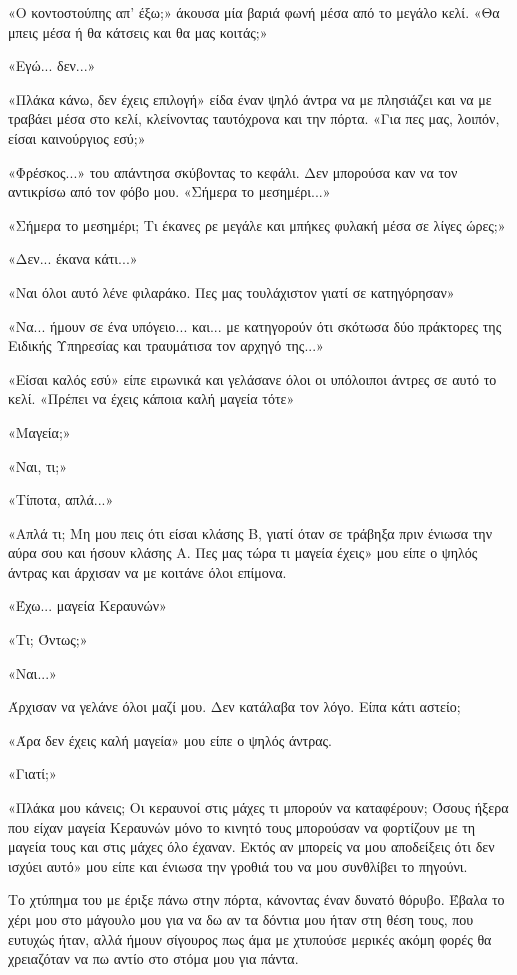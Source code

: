 \documentclass[12pt,twoside, openany]{book}
\begin{document}
«Ο κοντοστούπης απ’ έξω;» άκουσα μία βαριά φωνή μέσα από το μεγάλο κελί. «Θα μπεις μέσα ή θα κάτσεις και θα μας κοιτάς;»

«Εγώ... δεν...»

«Πλάκα κάνω, δεν έχεις επιλογή» είδα έναν ψηλό άντρα να με πλησιάζει και να με τραβάει μέσα στο κελί, κλείνοντας ταυτόχρονα και την πόρτα. «Για πες μας, λοιπόν, είσαι καινούργιος εσύ;»

«Φρέσκος...» του απάντησα σκύβοντας το κεφάλι. Δεν μπορούσα καν να τον αντικρίσω από τον φόβο μου. «Σήμερα το μεσημέρι...»

«Σήμερα το μεσημέρι; Τι έκανες ρε μεγάλε και μπήκες φυλακή μέσα σε λίγες ώρες;»

«Δεν... έκανα κάτι...»

«Ναι όλοι αυτό λένε φιλαράκο. Πες μας τουλάχιστον γιατί σε κατηγόρησαν»

«Να... ήμουν σε ένα υπόγειο... και... με κατηγορούν ότι σκότωσα δύο πράκτορες της Ειδικής Υπηρεσίας και τραυμάτισα τον αρχηγό της...»

«Είσαι καλός εσύ» είπε ειρωνικά και γελάσανε όλοι οι υπόλοιποι άντρες σε αυτό το κελί. «Πρέπει να έχεις κάποια καλή μαγεία τότε»

«Μαγεία;»

«Ναι, τι;»

«Τίποτα, απλά...»

«Απλά τι; Μη μου πεις ότι είσαι κλάσης Β, γιατί όταν σε τράβηξα πριν ένιωσα την αύρα σου και ήσουν κλάσης Α. Πες μας τώρα τι μαγεία έχεις» μου είπε ο ψηλός άντρας και άρχισαν να με κοιτάνε όλοι επίμονα.

«Έχω... μαγεία Κεραυνών»

«Τι; Όντως;»

«Ναι...»

Άρχισαν να γελάνε όλοι μαζί μου. Δεν κατάλαβα τον λόγο. Είπα κάτι αστείο;

«Άρα δεν έχεις καλή μαγεία» μου είπε ο ψηλός άντρας.

«Γιατί;»

«Πλάκα μου κάνεις; Οι κεραυνοί στις μάχες τι μπορούν να καταφέρουν; Όσους ήξερα που είχαν μαγεία Κεραυνών μόνο το κινητό τους μπορούσαν να φορτίζουν με τη μαγεία τους και στις μάχες όλο έχαναν. Εκτός αν μπορείς να μου αποδείξεις ότι δεν ισχύει αυτό» μου είπε και ένιωσα την γροθιά του να μου συνθλίβει το πηγούνι.

Το χτύπημα του με έριξε πάνω στην πόρτα, κάνοντας έναν δυνατό θόρυβο. Έβαλα το χέρι μου στο μάγουλο μου για να δω αν τα δόντια μου ήταν στη θέση τους, που ευτυχώς ήταν, αλλά ήμουν σίγουρος πως άμα με χτυπούσε μερικές ακόμη φορές θα χρειαζόταν να πω αντίο στο στόμα μου για πάντα.
\end{document}
